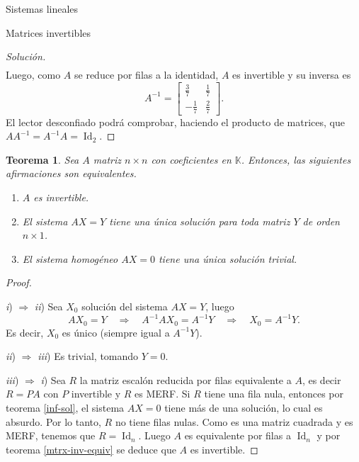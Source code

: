 \documentclass[a4paper,12pt,twoside,spanish,reqno]{amsbook}
\newtheorem{teorema}{Teorema}[section]
\theoremstyle{definition}
\theoremstyle{remark}
\newcommand{\Id}{\operatorname{Id}}
\newcommand{\K}{\mathbb K}
\begin{document}
\begin{chapter}{Sistemas lineales}
\begin{section}{Matrices invertibles}
\begin{proof}[Solución]
\begin{align*}
                \end{align*}
                Luego, como $A$ se reduce por filas a la identidad, $A$ es invertible y su inversa es  
                \begin{equation*}
                A^{-1}=\begin{bmatrix}\frac37&\frac17\\-\frac17&\frac27 \end{bmatrix}.
                \end{equation*}
                El lector desconfiado  podrá comprobar, haciendo el producto de matrices, que $AA^{-1} = A^{-1}A=\Id_2$.
            \end{proof}
            
            
            \begin{teorema}\label{mtrx-inv-equiv2} 
                Sea $A$ matriz $n \times n$ con coeficientes en $\K$. Entonces,  las siguientes afirmaciones son equivalentes. 
                \begin{enumerate}
                    \item[\textit{i})] $A$ es invertible.
                    \item[\textit{ii})] El sistema $AX=Y$ tiene una única solución para toda matriz $Y$ de orden $n \times 1$. 
                    \item[\textit{iii})] El sistema homogéneo $AX=0$ tiene una única solución trivial.
                \end{enumerate}
            \end{teorema}
            \begin{proof}
                
                \
                
                \textit{i}) $\Rightarrow$  \textit{ii}) Sea $X_0$ solución del sistema $AX=Y$, luego
                \begin{equation*}
                AX_0=Y  \quad \Rightarrow \quad  A^{-1}AX_0 = A^{-1}Y  \quad \Rightarrow \quad  X_0 = A^{-1}Y.
                \end{equation*}
                Es decir, $X_0$ es único (siempre igual  a $A^{-1}Y$).  
                
                
                \textit{ii}) $\Rightarrow$  \textit{iii}) Es trivial, tomando $Y =0$.
                
                
                
                \textit{iii}) $\Rightarrow$  \textit{i}) Sea $R$ la matriz escalón reducida por filas equivalente a $A$, es decir $R=PA$ con $P$ invertible y $R$ es MERF. Si $R$ tiene una fila nula, entonces por teorema \ref{inf-sol},  el sistema $AX =0$ tiene más de una solución, lo cual es absurdo.  Por lo tanto, $R$ no tiene filas nulas. Como es una matriz cuadrada y es MERF, tenemos que $R=\Id_n$. Luego $A$ es equivalente por filas a $\Id_n$ y por teorema \ref{mtrx-inv-equiv} se deduce que $A$ es invertible. 			
                

\end{proof}
\end{section}
\end{chapter}
\end{document}
